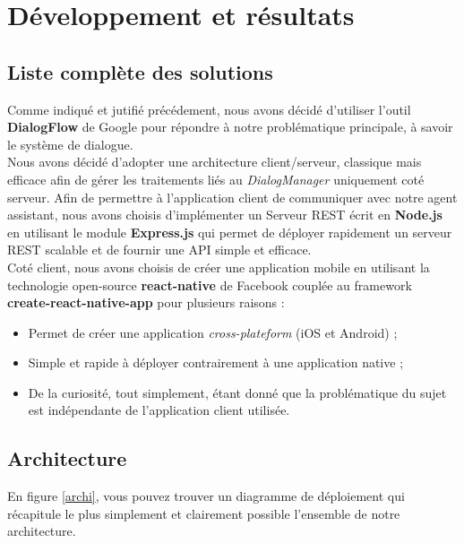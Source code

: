 \chapter{Développement et résultats}

\section{Liste complète des solutions}

Comme indiqué et jutifié précédement, nous avons décidé d'utiliser l'outil \textbf{DialogFlow} de Google\cite{dialogflow} pour répondre à notre problématique principale, à savoir
le système de dialogue.\\

Nous avons décidé d'adopter une architecture client/serveur, classique mais efficace afin de gérer les traitements liés au \emph{DialogManager} uniquement coté serveur. Afin
de permettre à l'application client de communiquer avec notre agent assistant, nous avons choisis d'implémenter un Serveur REST écrit en \textbf{Node.js}\cite{node} en
utilisant le module \textbf{Express.js}\cite{express} qui permet de déployer rapidement un serveur REST scalable et de fournir une API simple et efficace.\\

Coté client, nous avons choisis de créer une application mobile en utilisant la technologie open-source \textbf{react-native}\cite{reactnative} de Facebook couplée
au framework \textbf{create-react-native-app}\cite{createnative} pour plusieurs raisons :
\begin{itemize}
    \item Permet de créer une application \emph{cross-plateform} (iOS et Android) ;
    \item Simple et rapide à déployer contrairement à une application native ;
    \item De la curiosité, tout simplement, étant donné que la problématique du sujet est indépendante de l'application client utilisée.
\end{itemize}

\section{Architecture}

En figure \ref{archi}, vous pouvez trouver un diagramme de déploiement qui récapitule le plus simplement et clairement possible l'ensemble de notre architecture.

